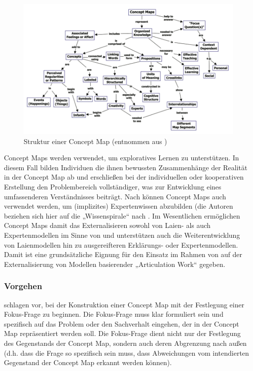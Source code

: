 \begin{figure}[htbp]
	\centering
		\includegraphics[width=12cm]{img/MentaleModelle/novak_concept_maps.png}
	\caption[Struktur einer Concept Map]{Struktur einer Concept Map (entnommen aus \citep[][S. 2]{Novak06})}
	\label{fig:img_MentaleModelle_novak_concept_maps}
\end{figure}

Concept Maps werden verwendet, um exploratives Lernen zu unterstützen. In diesem Fall bilden Individuen die ihnen bewussten Zusammenhänge der Realität in der Concept Map ab und erschließen bei der individuellen oder kooperativen Erstellung den Problembereich vollständiger, was zur Entwicklung eines umfassenderen Verständnisses beiträgt. Nach \citet{Novak06} können Concept Maps auch verwendet werden, um (implizites) Expertenwissen abzubilden (die Autoren beziehen sich hier auf die „Wissenspirale“ nach \citet{Nonaka95}. Im Wesentlichen ermöglichen Concept Maps damit das Externalisieren sowohl von Laien- als auch Expertenmodellen im Sinne von \citet{Seel91} und unterstützen auch die Weiterentwicklung von Laienmodellen hin zu ausgereifteren Erklärungs- oder Expertenmodellen.  Damit ist eine grundsätzliche Eignung für den Einsatz im Rahmen von auf der Externalisierung von Modellen basierender „Articulation Work“ gegeben.

\subsubsection{Vorgehen}

\citet{Novak06} schlagen vor, bei der Konstruktion einer Concept Map mit der Festlegung einer Fokus-Frage zu beginnen. Die Fokus-Frage muss klar formuliert sein und spezifisch auf das Problem oder den Sachverhalt eingehen, der in der Concept Map repräsentiert werden soll. Die Fokus-Frage dient nicht nur der Festlegung des Gegenstands der Concept Map, sondern auch deren Abgrenzung nach außen (d.h. dass die Frage so spezifisch sein muss, dass Abweichungen vom intendierten Gegenstand der Concept Map erkannt werden können).

